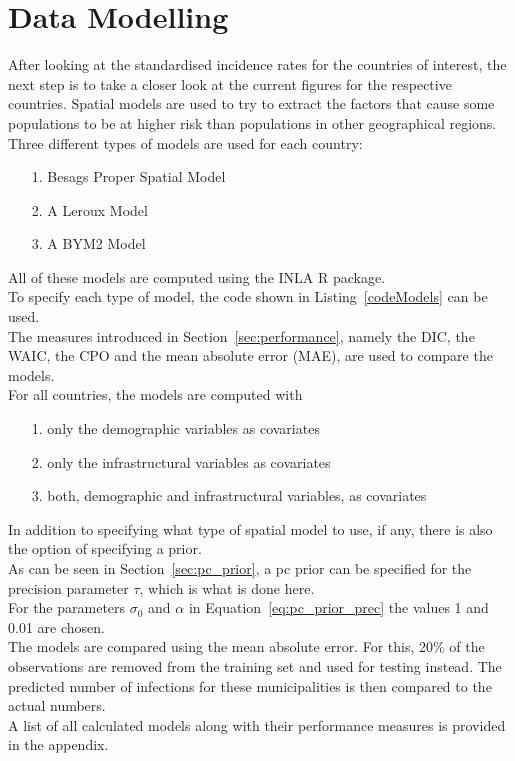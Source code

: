 \section{Data Modelling}
After looking at the standardised incidence rates for the countries of interest, the next step is to take a closer look at the current figures for the respective countries. Spatial models are used to try to extract the factors that cause some populations to be at higher risk than populations in other geographical regions. Three different types of models are used for each country:
\begin{itemize}
  \item[1.] Besags Proper Spatial Model
  \item[2.] A Leroux Model
  \item[3.] A BYM2 Model
\end{itemize}
All of these models are computed using the INLA \cite{rinla} R package. \\
To specify each type of model, the code shown in Listing~\ref{codeModels} can be used. \\
The measures introduced in Section~\ref{sec:performance}, namely the DIC, the WAIC, the CPO and the mean absolute error (MAE), are used to compare the models.\\
For all countries, the models are computed with
\begin{itemize}
  \item[1.] only the demographic variables as covariates
  \item[2.] only the infrastructural variables as covariates
  \item[3.] both, demographic and infrastructural variables, as covariates
\end{itemize}
In addition to specifying what type of spatial model to use, if any, there is also the option of specifying a prior. \\
As can be seen in Section~\ref{sec:pc_prior}, a pc prior can be specified for the precision parameter $\tau$, which is what is done here. \\
For the parameters $\sigma_0$ and $\alpha$ in Equation~\ref{eq:pc_prior_prec} the values 1 and 0.01 are chosen. \\
The models are compared using the mean absolute error. For this, 20\% of the observations are removed from the training set and used for testing instead. The predicted number of infections for these municipalities is then compared to the actual numbers.
\\
A list of all calculated models along with their performance measures is provided in the appendix.
